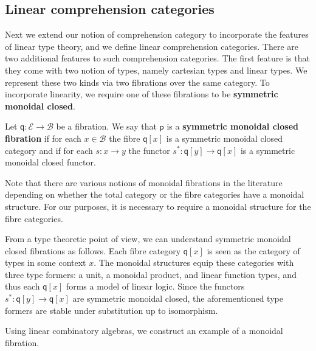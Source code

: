 \documentclass[a4paper,UKenglish,cleveref,numberwithinsect, autoref, thm-restate]{lipics-v2021}
\newcommand{\Base}{\mathcal{B}}
\newcommand{\Total}{\mathcal{E}}
\newcommand{\fib}{\mathsf{p}}
\newcommand{\subst}[1]{#1^*}
\newcommand{\fiber}[2]{#1[#2]}
\newcommand{\fibM}{\mathsf{q}}
\begin{document}
\subsection{Linear comprehension categories}
Next we extend our notion of comprehension category to incorporate the features of linear type theory,
and we define linear comprehension categories.
There are two additional features to such comprehension categories.
The first feature is that
they come with two notion of types,
namely cartesian types and linear types.
We represent these two kinds via two fibrations over the same category.
To incorporate linearity,
we require one of these fibrations to be \textbf{symmetric monoidal closed}.

\begin{definition}
\label{def:monoidal-fibration}
Let $\fibM : \Total \rightarrow \Base$ be a fibration.
We say that $\fib$ is a \textbf{symmetric monoidal closed fibration}
if for each $x \in \Base$ the fibre $\fiber{\fibM}{x}$ is a symmetric monoidal closed category
and if for each $s : x \rightarrow y$ the functor $\subst{s} : \fiber{\fibM}{y} \rightarrow \fiber{\fibM}{x}$ is a symmetric monoidal closed functor.
\end{definition}

Note that there are various notions of monoidal fibrations in the literature \cite{moeller:2020,shulman:2008}
depending on whether the total category or the fibre categories have a monoidal structure.
For our purposes,
it is necessary to require a monoidal structure for the fibre categories.

From a type theoretic point of view,
we can understand symmetric monoidal closed fibrations as follows.
Each fibre category $\fiber{\fibM}{x}$ is seen as the category of types
in some context $x$.
The monoidal structures equip these categories with three type formers:
a unit, a monoidal product, and linear function types,
and thus each $\fiber{\fibM}{x}$ forms a model of linear logic.
Since the functors $\subst{s} : \fiber{\fibM}{y} \rightarrow \fiber{\fibM}{x}$ are symmetric monoidal closed,
the aforementioned type formers are stable under substitution up to isomorphism.

Using linear combinatory algebras,
we construct an example of a monoidal fibration. 
\end{document}
